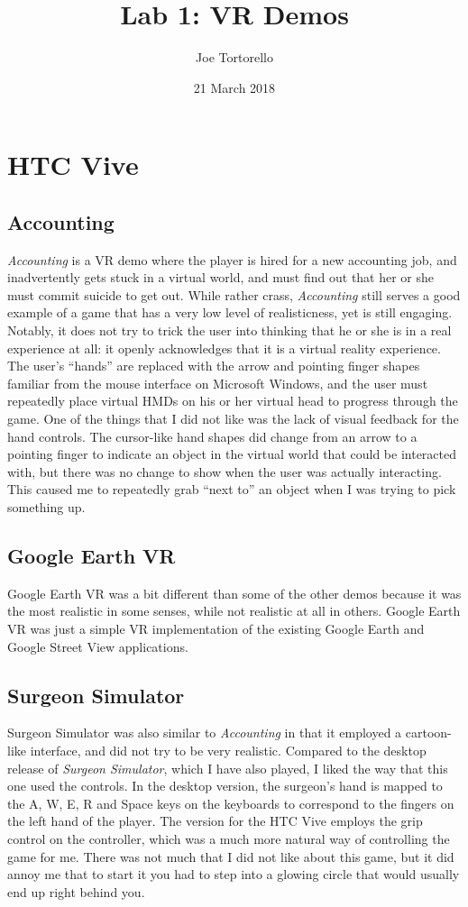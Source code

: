 \documentclass[11pt]{article}
\title{Lab 1: VR Demos}
\author{Joe Tortorello}
\date{21 March 2018}
\begin{document}
\maketitle
\section{HTC Vive}
\subsection{Accounting}
\textit{Accounting} is a VR demo where the player is hired for a new accounting job, and
inadvertently gets stuck in a virtual world, and must find out that her or she must commit
suicide to get out. While rather crass, \textit{Accounting} still serves a good example of
a game that has a very low level of realisticness, yet is still engaging. Notably, it does
not try to trick the user into thinking that he or she is in a real experience at all: it
openly acknowledges that it is a virtual reality experience. The user's ``hands'' are
replaced with the arrow and pointing finger shapes familiar from the mouse interface on
Microsoft Windows, and the user must repeatedly place virtual HMDs on his or her virtual
head to progress through the game. One of the things that I did not like was the lack of
visual feedback for the hand controls. The cursor-like hand shapes did change from an
arrow to a pointing finger to indicate an object in the virtual world that could be
interacted with, but there was no change to show when the user was actually interacting.
This caused me to repeatedly grab ``next to'' an object when I was trying to pick
something up.
\subsection{Google Earth VR}
Google Earth VR was a bit different than some of the other demos because it was the most
realistic in some senses, while not realistic at all in others. Google Earth VR was just a
simple VR implementation of the existing Google Earth and Google Street View applications.
\subsection{Surgeon Simulator}
Surgeon Simulator was also similar to \textit{Accounting} in that it employed a
cartoon-like interface, and did not try to be very realistic. Compared to the desktop 
release of \textit{Surgeon Simulator}, which I have also played, I liked the way that 
this one used the controls. In the desktop version, the surgeon's hand is mapped to the 
A, W, E, R and Space keys on the keyboards to correspond to the fingers on the left hand 
of the player. The version for the HTC Vive employs the grip control on the controller, 
which was a much more natural way of controlling the game for me. There was not much that 
I did not like about this game, but it did annoy me that to start it you had to step into 
a glowing circle that would usually end up right behind you.
\end{document}
